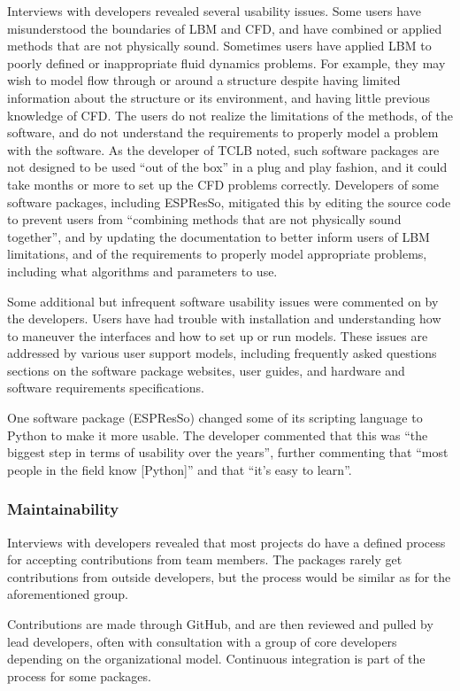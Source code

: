 \documentclass[12pt, notitlepage]{article}
\begin{document}
Interviews with developers revealed several usability issues. Some users have misunderstood the boundaries of LBM and CFD, and have combined or applied methods that are not physically sound. Sometimes users have applied LBM to poorly defined or inappropriate fluid dynamics problems. For example, they may wish to model flow through or around a structure despite having limited information about the structure or its environment, and having little previous knowledge of CFD. The users do not realize the limitations of the methods, of the software, and do not understand the requirements to properly model a problem with the software. As the developer of TCLB noted, such software packages are not designed to be used ``out of the box'' in a plug and play fashion, and it could take months or more to set up the CFD problems correctly. Developers of some software packages, including ESPResSo, mitigated this by editing the source code to prevent users from ``combining methods that are not physically sound together'', and by updating the documentation to better inform users of LBM limitations, and of the requirements to properly model appropriate problems, including what algorithms and parameters to use. 

Some additional but infrequent software usability issues were commented on by the developers. Users have had trouble with installation and understanding how to maneuver the interfaces and how to set up or run models. These issues are addressed by various user support models, including frequently asked questions sections on the software package websites, user guides, and hardware and software requirements specifications.

One software package (ESPResSo) changed some of its scripting language to Python to make it more usable. The developer commented that this was ``the biggest step in terms of usability over the years'', further commenting that ``most people in the field know [Python]'' and that ``it's easy to learn''. 

\subsubsection{Maintainability}

Interviews with developers revealed that most projects do have a defined process for accepting contributions from team members. The packages rarely get contributions from outside developers, but the process would be similar as for the aforementioned group.

Contributions are made through GitHub, and are then reviewed and pulled by lead developers, often with consultation with a group of core developers depending on the organizational model. Continuous integration is part of the process for some packages. 
\end{document}
